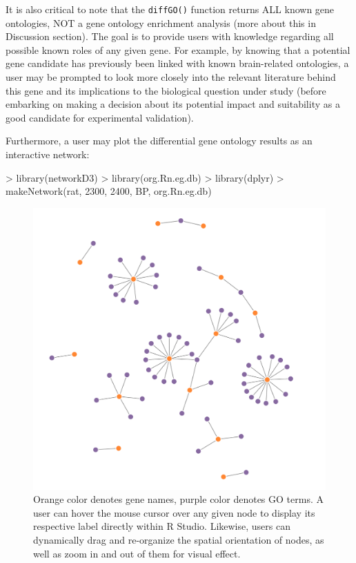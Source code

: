 \documentclass[12pt]{article}
\begin{document}
It is also critical to note that the \texttt{diffGO()} function returns ALL known gene ontologies, NOT a gene ontology enrichment analysis (more about this in Discussion section).  The goal is to provide users with knowledge regarding all possible known roles of any given gene.  For example, by knowing that a potential gene candidate has previously been linked with known brain-related ontologies, a user may be prompted to look more closely into the relevant literature behind this gene and its implications to the biological question under study (before embarking on making a decision about its potential impact and suitability as a good candidate for experimental validation).  

Furthermore, a user may plot the differential gene ontology results as an interactive network:

\begin{Schunk}
\begin{Sinput}
> library(networkD3)
> library(org.Rn.eg.db)
> library(dplyr)
> makeNetwork(rat, 2300, 2400, BP, org.Rn.eg.db)
\end{Sinput}
\end{Schunk}

\begin{figure}[H]
\centering
\includegraphics{figures/vignette_network_birdseye.png}
\caption{Orange color denotes gene names, purple color denotes GO terms.  A user can hover the mouse cursor over any given node to display its respective label directly within R Studio.  Likewise, users can dynamically drag and re-organize the spatial orientation of nodes, as well as zoom in and out of them for visual effect.}
\end{figure}
\end{document}
